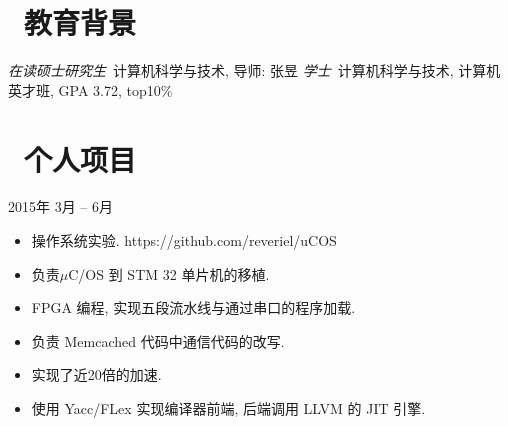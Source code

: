 \documentclass{resume}
\begin{document}



  \vspace{2mm}

\section{\faGraduationCap\  教育背景}
\textit{在读硕士研究生}\ 计算机科学与技术, 导师: 张昱
\textit{学士}\ 计算机科学与技术, 计算机英才班, GPA 3.72, top10\%


\section{\faUsers\ 个人项目}

 {2015年 3月 -- 6月}
\begin{itemize}
  \item 操作系统实验.  https://github.com/reveriel/uCOS
  \item 负责$\mu$C/OS 到 STM 32 单片机的移植.
\end{itemize}

\begin{itemize}
  \item FPGA 编程, 实现五段流水线与通过串口的程序加载.
\end{itemize}

\begin{itemize}
  \item 负责 Memcached 代码中通信代码的改写.
  \item 实现了近20倍的加速.
\end{itemize}

\begin{itemize}
  \item 使用 Yacc/FLex 实现编译器前端, 后端调用 LLVM 的 JIT 引擎.
\end{itemize}
\end{document}
